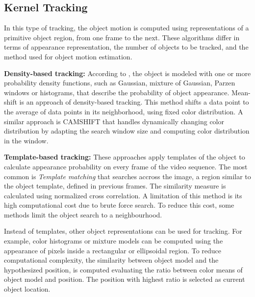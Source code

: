 \subsection{Kernel Tracking}

In this type of tracking, the object motion is computed using representations
of a primitive object region, from one frame to the next. These algorithms
differ in terms of appearance representation, the number of objects to be
tracked, and the method used for object motion estimation. 

\textbf{Density-based tracking:} According to \cite{Cheng1995}, the object is
modeled with one or more probability density functions, such as
Gaussian, mixture of Gaussian, Parzen windows or histograms, that describe
the probability of object appearance. Mean-shift is an approach of density-based
tracking. This method shifts a data point to the average of data points
in its neighborhood, using fixed color distribution. A similar
approach is CAMSHIFT \cite{Exner2010} that handles dynamically
changing color distribution by adapting the search window size
and computing color distribution in the window.

\textbf{Template-based tracking:}  These approaches apply templates of the
object to calculate appearance probability on every frame of the
video sequence. The most common is \textit{Template \gls{matching}} \cite{Korman2013}
that searches accross the image, a region similar to the object template, defined
in previous frames. The similarity measure is calculated using normalized cross
correlation. A limitation of this method is its high computational cost due to
brute force search. To reduce this cost, some methods limit the object search
to a neighbourhood.

Instead of templates, other object representations can be used for tracking.
For example, color histograms or mixture models can be computed using the
appearance of pixels inside a rectangular or ellipsoidal region. To reduce
computational complexity, the similarity between object model and the
hypothesized position, is computed evaluating the ratio between color means of
object model and position. The position with highest ratio is selected as
current object location.

